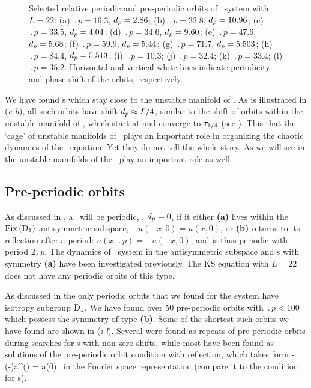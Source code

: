\begin{figure}[h!t]
{Selected relative periodic and
pre-periodic
orbits of \KS\ system with $L = 22$:
(a) $\period{p} = 16.3$, $d_p = 2.86$;
(b) $\period{p} = 32.8$, $d_p = 10.96$;
(c) $\period{p} = 33.5$, $d_p = 4.04$;
(d) $\period{p} = 34.6$, $d_p = 9.60$;
(e) $\period{p} = 47.6$, $d_p = 5.68$;
(f) $\period{p} = 59.9$, $d_p = 5.44$;
(g) $\period{p} = 71.7$, $d_p = 5.503$;
(h) $\period{p} = 84.4$, $d_p = 5.513$;
(i) $\period{p} = 10.3$;
(j) $\period{p} = 32.4$;
(k) $\period{p} = 33.4$;
(l) $\period{p} = 35.2$.
Horizontal and vertical white lines indicate periodicity and phase
shift of the orbits, respectively.
}\label{f:ks22rpos}
\end{figure}


We have found \rpo s which stay close to the unstable
manifold of . As is illustrated in
(\textit{e-h}), all such orbits have shift
$d_p \approx L/4$, similar to the shift of orbits within
the unstable manifold of , which start at  and
converge to $\tau_{1/4}$ (see ).
This  that the `cage' of
unstable manifolds of \eqva\ plays an important role in
organizing the chaotic dynamics of the \KS\ equation. Yet
they do not tell the whole story. As we will see in
 the unstable manifolds of the
\reqva\ play an important role as well.


\subsection{Pre-periodic orbits} \label{ssec:po}

As discussed in , a \rpo\ will be periodic, \ie,
$d_p = 0$, if it either {\bf (a)} lives within the $\mathrm{Fix}\left(\mathrm{D}_{1}\right)$ antisymmetric
subspace, $-u(-x,0) = u(x,0)$, or {\bf (b)}
returns to its reflection
after a period: $u(x,\period{p})=-u(-x,0)$,
and is thus periodic
with period $2\period{p}$.
The dynamics of
\KS\ system in the antisymmetric subspace and \po s with symmetry {\bf (a)} have
been investigated
previously. The KS equation
with $L = 22$ does not have any periodic orbits of this type.

As discussed in  the only periodic
orbits that we found for the system have isotropy subgroup $\mathrm{D}_{1}$.
We have found over 50
pre-periodic orbits with $\period{p} < 100$
which possess the symmetry
of type {\bf (b)}. Some of the shortest such orbits we have found are shown in
(\textit{i-l}).
Several were found as
repeats of pre-periodic orbits during searches
for \rpo s with non-zero shifts,
while most have been
found as solutions of the pre-periodic orbit
condition  with reflection,
which takes form
\beq
 -(-\shift)a^\ast() = a(0)\,.
\label{KSposFour}
\eeq
in the Fourier space representation
(compare it to the condition  for \rpo s).


